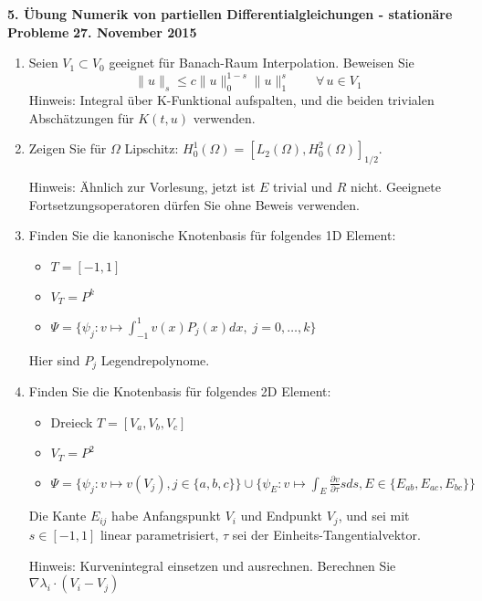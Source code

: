 \documentclass[11pt,a4paper]{report}
\begin{document}
\begin{center}
\textbf{5. \"Ubung Numerik von partiellen Differentialgleichungen - station\"are Probleme} \newline 
\textbf{27. November 2015}
\end{center}
\begin{enumerate}
\item
Seien $V_1 \subset V_0$ geeignet f\"ur Banach-Raum Interpolation. Beweisen Sie
$$
\| u \|_{s} \leq c \|u \|_0^{1-s} \|u \|_1^s \qquad \forall \, u \in V_1
$$
Hinweis: Integral \"uber K-Funktional aufspalten, und die beiden
trivialen Absch\"atzungen f\"ur $K(t,u)$ verwenden.

\item
Zeigen Sie f\"ur $\Omega$ Lipschitz: $H_0^1(\Omega) = [L_2(\Omega),
H_0^2(\Omega)]_{1/2}$.

Hinweis: \"Ahnlich zur Vorlesung, jetzt ist $E$ trivial und $R$
nicht. Geeignete Fortsetzungsoperatoren d\"urfen Sie ohne Beweis verwenden. 

\item
Finden Sie die kanonische \glqq Knotenbasis \grqq  f\"ur folgendes 1D Element: 
\begin{itemize}
\item $T = [-1,1]$
\item $V_T = P^k$
\item $\Psi = \{ \psi_j : v \mapsto \int_{-1}^1 v(x) P_j(x)  dx,  \; j = 0, \ldots, k \}$ 
\end {itemize}
Hier sind $P_j$ Legendrepolynome.


\item Finden Sie die Knotenbasis f\"ur folgendes 2D Element:
\begin{itemize}
\item Dreieck $T = [V_a, V_b, V_c]$
\item $V_T = P^2$
\item $\Psi = \{ \psi_j : v \mapsto v(V_j), j \in \{ a, b, c \} \}
  \cup \{ \psi_E : v \mapsto \int_E \frac{\partial v}{\partial \tau} s
  ds
  , E \in \{ E_{ab}, E_{ac}, E_{bc} \}\}$
\end{itemize}
Die Kante $E_{ij}$ habe Anfangspunkt $V_i$ und Endpunkt $V_j$, und
sei mit $s \in [-1,1]$ linear parametrisiert, $\tau$ sei der
Einheits-Tangentialvektor.

Hinweis: Kurvenintegral einsetzen und ausrechnen. Berechnen Sie
$\nabla \lambda_i \cdot (V_i - V_j)$


\end{enumerate}
\end{document}
